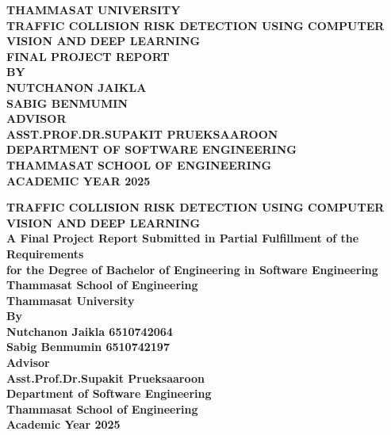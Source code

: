 \documentclass[12pt]{report}
\begin{document}

\begin{titlepage}
    \centering
    \bfseries
    \fontsize{14pt}{18pt}\selectfont
    \MakeUppercase{Thammasat University}\\[2cm]
    \MakeUppercase{Traffic Collision Risk Detection using Computer Vision and Deep Learning}\\[2cm]
    \MakeUppercase{Final Project Report}\\[2cm]
    \MakeUppercase{By}\\[0.5cm]
    \MakeUppercase{Nutchanon Jaikla}\\
    \MakeUppercase{Sabig Benmumin}\\[2cm]
    \MakeUppercase{Advisor}\\[0.5cm]
    \MakeUppercase{Asst.Prof.Dr.Supakit Prueksaaroon}\\[2cm]
    \MakeUppercase{Department of Software Engineering}\\
    \MakeUppercase{Thammasat School of Engineering}\\
    \MakeUppercase{Academic Year 2025}
\end{titlepage}

\begin{titlepage}
    \centering
    \bfseries
    \fontsize{14pt}{18pt}\selectfont
    \MakeUppercase{Traffic Collision Risk Detection using Computer Vision and Deep Learning}\\[1.5cm]
    \normalfont\fontsize{12pt}{14pt}\selectfont
    A Final Project Report Submitted in Partial Fulfillment of the Requirements\\
    for the Degree of Bachelor of Engineering in Software Engineering\\
    Thammasat School of Engineering\\
    Thammasat University\\[1.5cm]
    \bfseries
    By\\[0.5cm]
    Nutchanon Jaikla 6510742064\\
    Sabig Benmumin 6510742197\\[1.5cm]
    Advisor\\[0.5cm]
    Asst.Prof.Dr.Supakit Prueksaaroon\\[1.5cm]
    Department of Software Engineering\\
    Thammasat School of Engineering\\
    Academic Year 2025
\end{titlepage}
\end{document}

